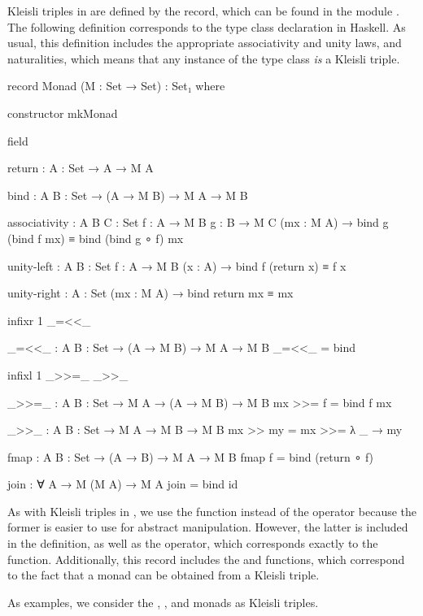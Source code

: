 Kleisli triples in \agda are defined by the  record,
which can be found in the module . The
following definition corresponds to the  type class
declaration in Haskell. As usual, this definition includes the
appropriate associativity and unity laws, and naturalities, which
means that any instance of the  type class \emph{is} a
Kleisli triple.
\begin{codeagda}
record Monad (M : Set → Set) : Set₁ where

  constructor mkMonad

  field

    return : {A : Set} → A → M A

    bind   : {A B : Set} → (A → M B) → M A → M B

    associativity : {A B C : Set} {f : A → M B} {g : B → M C}
                    (mx : M A) →
                    bind g (bind f mx) ≡ bind (bind g ∘ f) mx

    unity-left    : {A B : Set} {f : A → M B} (x : A) →
                    bind f (return x) ≡ f x

    unity-right   : {A : Set} (mx : M A) → bind return mx ≡ mx

  infixr 1 _=<<_

  _=<<_ : {A B : Set} → (A → M B) → M A → M B
  _=<<_ = bind

  infixl 1 _>>=_ _>>_

  _>>=_ : {A B : Set} → M A → (A → M B) → M B
  mx >>= f = bind f mx

  _>>_ : {A B : Set} → M A → M B → M B
  mx >> my = mx >>= λ _ → my

  fmap : {A B : Set} → (A → B) → M A → M B
  fmap f = bind (return ∘ f)

  join : ∀ {A} → M (M A) → M A
  join = bind id
\end{codeagda}
As with Kleisli triples in \hask, we use the  function
instead of the \textagda{\_>>=\_} operator because the former is
easier to use for abstract manipulation. However, the latter is
included in the definition, as well as the \textagda{\_=<<\_}
operator, which corresponds exactly to the  function.
Additionally, this record includes the  and
 functions, which correspond to the fact that a monad
can be obtained from a Kleisli triple.

As examples, we consider the , ,
and  monads as Kleisli triples.


